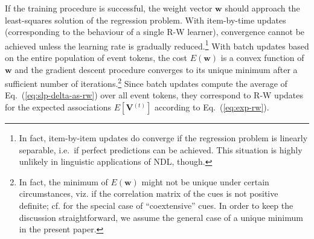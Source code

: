 \documentclass[conference]{IEEEtran}
\newcommand{\psup}[1]{\ensuremath{^{(#1)}}}
\newcommand{\psupt}{\psup{t}}
\begin{document}
If the training procedure is successful, the weight vector $\mathbf{w}$ should approach the least-squares solution of the regression problem.  With item-by-time updates (corresponding to the behaviour of a single R-W learner), convergence cannot be achieved unless the learning rate is gradually reduced.\footnote{In fact, item-by-item updates do converge if the regression problem is linearly separable, i.e.\ if perfect predictions can be achieved. This situation is highly unlikely in linguistic applications of NDL, though.}  With batch updates based on the entire population of event tokens, the cost $E(\mathbf{w})$ is a convex function of $\mathbf{w}$ and the gradient descent procedure converges to its unique minimum after a sufficient number of iterations.\footnote{In fact, the minimum of $E(\mathbf{w})$ might not be unique under certain circumstances, viz. if the correlation matrix of the cues is not positive definite; cf. \cite[pp.\ 115--116]{danks2003} for the special case of ``coextensive'' cues. In order to keep the discussion straightforward, we assume the general case of a unique minimum in the present paper.}
Since batch updates compute the average of Eq.~(\ref{eq:slp-delta-as-rw}) over all event tokens, they correspond to R-W updates for the expected associations $E[\mathbf{V}\psupt]$ according to Eq.~(\ref{eq:exp-rw}).
\end{document}
